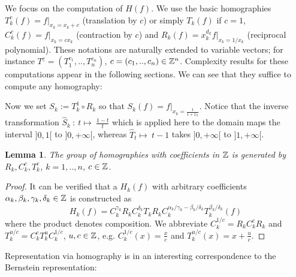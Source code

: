 \documentclass{sig-alternate}
\newtheorem{lemma}[theorem]{Lemma}
\newcommand{\dott}{{..}}
\newcommand{\uvec}[1]{\underline{#1}}
\begin{document}
We focus on the computation of $H(f)$. 
We use the basic homographies $T_{k}^{c}(f)= f|_{x_k=x_k+c} $
(translation by $c$) or simply $T_k(f)$ if $c=1$, $C_k^c( f ) =
f|_{x_k=cx_{k}} $ (contraction by $c$) and $R_{k}(f)=
x_k^{d_k}f|_{x_k=1/x_{k}}$ (reciprocal polynomial).
These notations are naturally extended to variable vectors; for instance
$T^{\uvec c}=(T_1^{c_1},\dott,T_n^{c_n} )$, $c=(c_1,\dott,c_n)\in\ZZ^n$.
Complexity results for these computations appear in the following sections.
We can see that they suffice to compute any homography:

Now we set $S_k:= T_{k}^{1} \circ R_{k}$ so that $S_k(f)= f|_{x_k=\frac{1}{1+x_k}}$.
Notice that the inverse transformation $\widehat S_k \ : \ t \mapsto \
\frac{1-t}{t}$ which is applied here to the domain maps the interval
$]0,1[$ to $]0,+\infty[$,
whereas $\widehat T_t \mapsto\ t-1$ takes $]0,+\infty[$ to $]1,+\infty[$.
\fi

\begin{lemma}
The group of homographies with coefficients in ${\mathbb Z}$ is generated by $R_k,C_k^c,T_k^c$, $k=1,\dott,n$, $c\in{\mathbb Z}$.
\end{lemma}
\begin{proof}
It can be verified that a $H_k(f)$ with arbitrary coefficients $\alpha_k, \beta_k, \gamma_k, \delta_k \in {\mathbb Z} $ is constructed as
$$
H_k(f) =  C_k^{\gamma_k}R_kC_k^{\delta_k}T_kR_kC_k^{ \alpha_k/\gamma_k -  \beta_k/\delta_k } T_k^{\beta_k/\delta_k} (f)
$$
where the product denotes composition.  We abbreviate 
$C_k^{1/c}=R_kC_k^cR_k$ 
and 
$T_k^{u/c}= C_k^cT_k^uC_k^{1/c}$, $u,c\in{\mathbb Z}$,
e.g. $C_k^{1/c}(x)=\frac x c$ and $T_k^{u/c}(x)=x+\frac u c$.


\end{proof}

Representation via homography is in an interesting correspondence to
the Bernstein representation:
\end{document}
